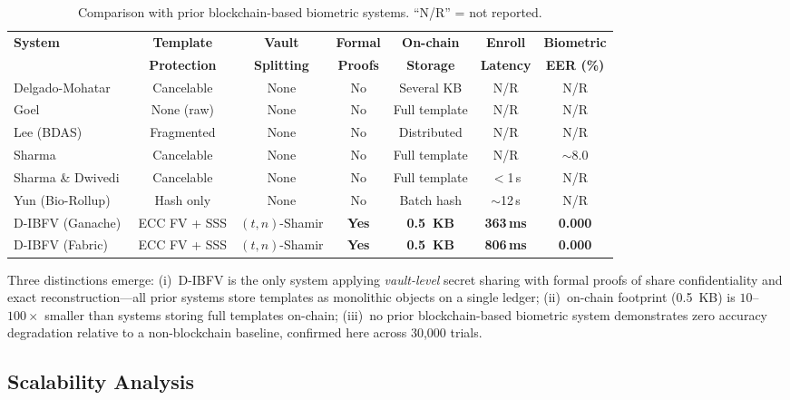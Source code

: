 \documentclass[3p,twocolumn]{elsarticle}
\newcommand{\DIBFV}{\textsf{D-IBFV}}
\begin{document}
\begin{table}[t]
\centering
\caption{Comparison with prior blockchain-based biometric systems. ``N/R'' = not reported.}
\label{tab:blockchain_comparison}
\begin{tabular}{@{}l c c c c c c@{}}
\toprule
\textbf{System} & \textbf{Template} & \textbf{Vault} & \textbf{Formal} & \textbf{On-chain} & \textbf{Enroll} & \textbf{Biometric} \\
 & \textbf{Protection} & \textbf{Splitting} & \textbf{Proofs} & \textbf{Storage} & \textbf{Latency} & \textbf{EER (\%)} \\
\midrule
Delgado-Mohatar~\cite{delgado2020blockchain} & Cancelable & None & No & Several KB & N/R & N/R \\
Goel~\cite{goel2019securing} & None (raw) & None & No & Full template & N/R & N/R \\
Lee (BDAS)~\cite{lee2021securing} & Fragmented & None & No & Distributed & N/R & N/R \\
Sharma~\cite{sharma2024multimodal} & Cancelable & None & No & Full template & N/R & $\sim$8.0 \\
Sharma \& Dwivedi~\cite{sharma2026fabric} & Cancelable & None & No & Full template & $<$1\,s & N/R \\
Yun (Bio-Rollup)~\cite{yun2024biorollup} & Hash only & None & No & Batch hash & $\sim$12\,s & N/R \\
\midrule
\DIBFV{} (Ganache) & ECC FV + SSS & $(t,n)$-Shamir & \textbf{Yes} & \textbf{0.5~KB} & \textbf{363\,ms} & \textbf{0.000} \\
\DIBFV{} (Fabric) & ECC FV + SSS & $(t,n)$-Shamir & \textbf{Yes} & \textbf{0.5~KB} & \textbf{806\,ms} & \textbf{0.000} \\
\bottomrule
\end{tabular}
\end{table}

Three distinctions emerge: (i)~\DIBFV{} is the only system applying \emph{vault-level} secret sharing with formal proofs of share confidentiality and exact reconstruction---all prior systems store templates as monolithic objects on a single ledger; (ii)~on-chain footprint (0.5~KB) is $10$--$100\times$ smaller than systems storing full templates on-chain; (iii)~no prior blockchain-based biometric system demonstrates zero accuracy degradation relative to a non-blockchain baseline, confirmed here across 30{,}000 trials.

\subsection{Scalability Analysis}
\label{sec:scalability}
\end{document}

